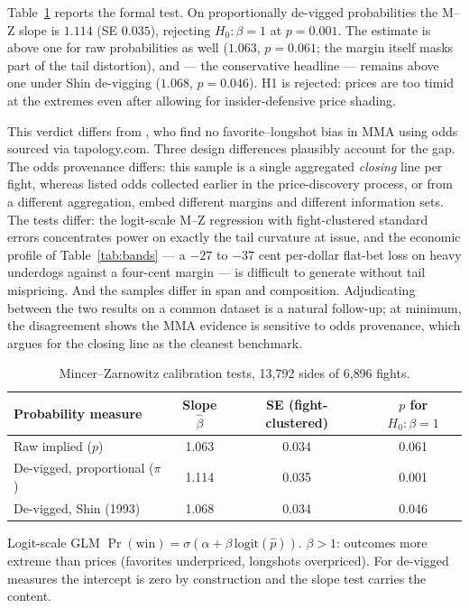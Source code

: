 \documentclass[11pt]{article}
\newcommand{\devig}{de-vigged}
\begin{document}
Table~\ref{tab:mz} reports the formal test. On proportionally \devig{} probabilities the M--Z
slope is $1.114$ (SE $0.035$), rejecting $H_0\!:\beta=1$ at $p=0.001$. The estimate is above one
for raw probabilities as well ($1.063$, $p=0.061$; the margin itself masks part of the tail
distortion), and --- the conservative headline --- remains above one under Shin de-vigging
($1.068$, $p=0.046$). H1 is rejected: prices are too timid at the extremes even after allowing
for insider-defensive price shading.

This verdict differs from \citet{miller2026}, who find no favorite--longshot bias in MMA using
odds sourced via tapology.com. Three design differences plausibly account for the gap. The odds
provenance differs: this sample is a single aggregated \emph{closing} line per fight, whereas
listed odds collected earlier in the price-discovery process, or from a different aggregation,
embed different margins and different information sets. The tests differ: the logit-scale M--Z
regression with fight-clustered standard errors concentrates power on exactly the tail curvature
at issue, and the economic profile of Table~\ref{tab:bands} --- a $-27$ to $-37$ cent per-dollar
flat-bet loss on heavy underdogs against a four-cent margin --- is difficult to generate without
tail mispricing. And the samples differ in span and composition. Adjudicating between the two
results on a common dataset is a natural follow-up; at minimum, the disagreement shows the MMA
evidence is sensitive to odds provenance, which argues for the closing line as the cleanest
benchmark.

\begin{table}[t]
\centering
\begin{threeparttable}
\caption{Mincer--Zarnowitz calibration tests, 13{,}792 sides of 6{,}896 fights.}
\label{tab:mz}
\begin{tabular}{lccc}
\toprule
Probability measure & Slope $\hat\beta$ & SE (fight-clustered) & $p$ for $H_0\!:\beta=1$ \\
\midrule
Raw implied ($p$)                 & 1.063 & 0.034 & 0.061 \\
De-vigged, proportional ($\pi$)   & 1.114 & 0.035 & 0.001 \\
De-vigged, Shin (1993)            & 1.068 & 0.034 & 0.046 \\
\bottomrule
\end{tabular}
\begin{tablenotes}\footnotesize
\item Logit-scale GLM $\Pr(\text{win}) = \sigma(\alpha + \beta\,\mathrm{logit}(\hat p))$.
$\beta>1$: outcomes more extreme than prices (favorites underpriced, longshots overpriced). For
\devig{} measures the intercept is zero by construction and the slope test carries the content.
\end{tablenotes}
\end{threeparttable}
\end{table}
\end{document}
